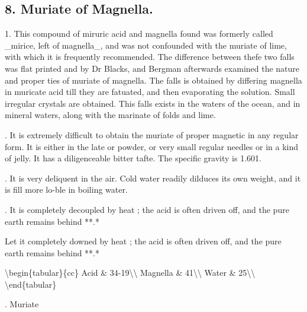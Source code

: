 \subsection*{8. Muriate of Magnella.}
1. This compound of miruric acid and magnella found was formerly called \_mirice, left of magnella\_, and was not confounded with the muriate of lime, with which it is frequently recommended. The difference between thefe two falls was flat printed and by Dr Blacks, and Bergman afterwards examined the nature and proper ties of muriate of magnella. The falls is obtained by differing magnella in muricate acid till they are fatuated, and then evaporating the solution. Small irregular crystals are obtained. This falls exists in the waters of the ocean, and in mineral waters, along with the marinate of folds and lime.\par{}. It is extremely difficult to obtain the muriate of proper magnetic in any regular form. It is either in the late or powder, or very small regular needles or in a kind of jelly. It has a diligenceable bitter tafte. The specific gravity is 1.601.\par{}. It is very deliquent in the air. Cold water readily dilduces its own weight, and it is fill more lo-ble in boiling water.\par{}. It is completely decoupled by heat ; the acid is often driven off, and the pure earth remains behind **.*\par\medskip
Let it completely downed by heat ; the acid is often driven off, and the pure earth remains behind **.*\par\medskip
\textbackslash{}begin\{tabular\}\{cc\}
Acid \& 34-19\textbackslash{}\textbackslash{}
Magnella \& 41\textbackslash{}\textbackslash{}
Water \& 25\textbackslash{}\textbackslash{}
\textbackslash{}end\{tabular\}\par{}. Muriate\par\medskip
